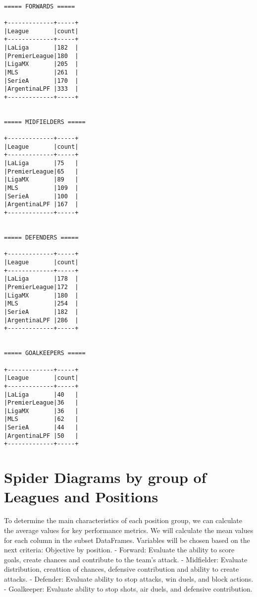 \documentclass[11pt]{article}
\makeatletter
\newcommand{\boxspacing}{\kern\kvtcb@left@rule\kern\kvtcb@boxsep}
\newcommand{\prompt}[4]{
        {\ttfamily\llap{{\color{#2}[#3]:\hspace{3pt}#4}}\vspace{-\baselineskip}}
    }
\makeatother
\begin{document}
    \begin{tcolorbox}[breakable, size=fbox, boxrule=1pt, pad at break*=1mm,colback=cellbackground, colframe=cellborder]
\prompt{In}{incolor}{35}{\boxspacing}
\begin{Verbatim}[commandchars=\\\{\}]

\end{Verbatim}
\end{tcolorbox}

    \begin{Verbatim}[commandchars=\\\{\}]

===== FORWARDS =====

+-------------+-----+
|League       |count|
+-------------+-----+
|LaLiga       |182  |
|PremierLeague|180  |
|LigaMX       |205  |
|MLS          |261  |
|SerieA       |170  |
|ArgentinaLPF |333  |
+-------------+-----+


===== MIDFIELDERS =====

+-------------+-----+
|League       |count|
+-------------+-----+
|LaLiga       |75   |
|PremierLeague|65   |
|LigaMX       |89   |
|MLS          |109  |
|SerieA       |100  |
|ArgentinaLPF |167  |
+-------------+-----+


===== DEFENDERS =====

+-------------+-----+
|League       |count|
+-------------+-----+
|LaLiga       |178  |
|PremierLeague|172  |
|LigaMX       |180  |
|MLS          |254  |
|SerieA       |182  |
|ArgentinaLPF |286  |
+-------------+-----+


===== GOALKEEPERS =====

+-------------+-----+
|League       |count|
+-------------+-----+
|LaLiga       |40   |
|PremierLeague|36   |
|LigaMX       |36   |
|MLS          |62   |
|SerieA       |44   |
|ArgentinaLPF |50   |
+-------------+-----+

    \end{Verbatim}

    \section{Spider Diagrams by group of Leagues and
Positions}\label{spider-diagrams-by-group-of-leagues-and-positions}

    To determine the main characteristics of each position group, we can
calculate the average values for key performance metrics. We will
calculate the mean values for each column in the subset DataFrames.
Variables will be chosen based on the next criteria: Objective by
position. - Forward: Evaluate the ability to score goals, create chances
and contribute to the team's attack. - Midfielder: Evaluate
distribution, creattion of chances, defensive contribution and ability
to create attacks. - Defender: Evaluate ability to stop attacks, win
duels, and block actions. - Goalkeeper: Evaluate ability to stop shots,
air duels, and defensive contribution.
\end{document}
